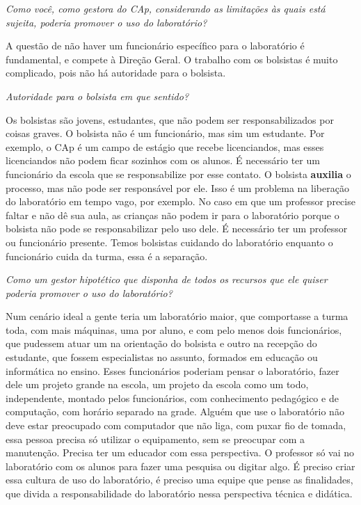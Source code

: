 \textit{Como você, como gestora do CAp, considerando as limitações às quais está sujeita, poderia promover o uso do laboratório?}

A questão de não haver um funcionário específico para o laboratório é fundamental, e compete à Direção Geral. O trabalho com os bolsistas é muito complicado, pois não há autoridade para o bolsista.

\textit{Autoridade para o bolsista em que sentido?}

Os bolsistas são jovens, estudantes, que não podem ser responsabilizados por coisas graves. O bolsista não é um funcionário, mas sim um estudante. Por exemplo, o CAp é um campo de estágio que recebe licenciandos, mas esses licenciandos não podem ficar sozinhos com os alunos. É necessário ter um funcionário da escola que se responsabilize por esse contato. O bolsista \textbf{auxilia} o processo, mas não pode ser responsável por ele. Isso é um problema na liberação do laboratório em tempo vago, por exemplo. No caso em que um professor precise faltar e não dê sua aula, as crianças não podem ir para o laboratório porque o bolsista não pode se responsabilizar pelo uso dele. É necessário ter um professor ou funcionário presente. Temos bolsistas cuidando do laboratório enquanto o funcionário cuida da turma, essa é a separação.

\textit{Como um gestor hipotético que disponha de todos os recursos que ele quiser poderia promover o uso do laboratório?}

Num cenário ideal a gente teria um laboratório maior, que comportasse a turma toda, com mais máquinas, uma por aluno, e com pelo menos dois funcionários, que pudessem atuar um na orientação do bolsista e outro na recepção do estudante, que fossem especialistas no assunto, formados em educação ou informática no ensino. Esses funcionários poderiam pensar o laboratório, fazer dele um projeto grande na escola, um projeto da escola como um todo, independente, montado pelos funcionários, com conhecimento pedagógico e de computação, com horário separado na grade. Alguém que use o laboratório não deve estar preocupado com computador que não liga, com puxar fio de tomada, essa pessoa precisa só utilizar o equipamento, sem se preocupar com a manutenção. Precisa ter um educador com essa perspectiva. O professor só vai no laboratório com os alunos para fazer uma pesquisa ou digitar algo. É preciso criar essa cultura de uso do laboratório, é preciso uma equipe que pense as finalidades, que divida a responsabilidade do laboratório nessa perspectiva técnica e didática.

